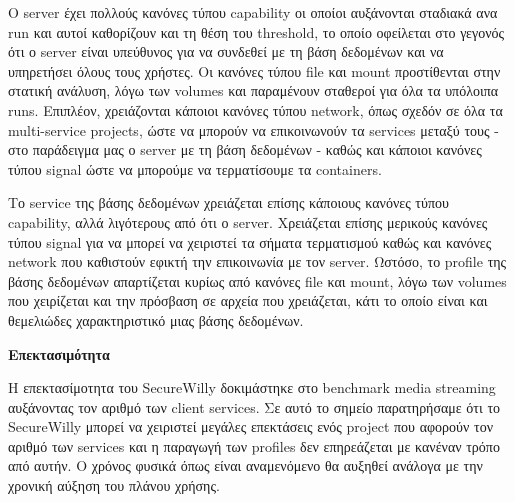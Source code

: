 Ο \en server\gr{} έχει πολλούς κανόνες τύπου \en capability\gr{} οι οποίοι αυξάνονται σταδιακά ανα \en run\gr{} και αυτοί καθορίζουν και τη θέση του \en threshold\gr{}, το οποίο οφείλεται στο γεγονός ότι ο \en server\gr{} είναι υπεύθυνος για να συνδεθεί με τη βάση δεδομένων και να υπηρετήσει όλους τους χρήστες. Οι κανόνες τύπου \en file\gr{} και \en mount\gr{} προστίθενται στην στατική ανάλυση, λόγω των \en volumes\gr{} και παραμένουν σταθεροί για όλα τα υπόλοιπα \en runs\gr{}. Επιπλέον, χρειάζονται κάποιοι κανόνες τύπου \en network\gr{}, όπως σχεδόν σε όλα τα \en multi-service projects\gr{}, ώστε να μπορούν να επικοινωνούν τα \en services\gr{} μεταξύ τους - στο παράδειγμα μας ο \en server\gr{} με τη βάση δεδομένων - καθώς και κάποιοι κανόνες τύπου \en signal\gr{} ώστε να μπορούμε να τερματίσουμε τα \en containers\gr{}.

Το \en service\gr{} της βάσης δεδομένων χρειάζεται επίσης κάποιους κανόνες τύπου \en capability\gr{}, αλλά λιγότερους από ότι ο \en server\gr{}. Χρειάζεται επίσης μερικούς κανόνες τύπου \en signal\gr{} για να μπορεί να χειριστεί τα σήματα τερματισμού καθώς και κανόνες \en network\gr{} που καθιστούν εφικτή την επικοινωνία με τον \en server\gr{}. Ωστόσο, το \en profile\gr{} της βάσης δεδομένων απαρτίζεται κυρίως από κανόνες \en file\gr{} και \en mount\gr{}, λόγω των \en volumes\gr{} που χειρίζεται και την πρόσβαση σε αρχεία που χρειάζεται, κάτι το οποίο είναι και θεμελιώδες χαρακτηριστικό μιας βάσης δεδομένων.

\hfill\break
\textbf{Επεκτασιμότητα}
\hfill\break

Η επεκτασίμοτητα του \en SecureWilly\gr{} δοκιμάστηκε στο \en benchmark media streaming\gr{} αυξάνοντας τον αριθμό των \en client services\gr{}. Σε αυτό το σημείο παρατηρήσαμε ότι το \en SecureWilly\gr{} μπορεί να χειριστεί μεγάλες επεκτάσεις ενός \en project\gr{} που αφορούν τον αριθμό των \en services\gr{} και η παραγωγή των \en profiles\gr{} δεν επηρεάζεται με κανέναν τρόπο από αυτήν. Ο χρόνος φυσικά όπως είναι αναμενόμενο θα αυξηθεί ανάλογα με την χρονική αύξηση του πλάνου χρήσης.

